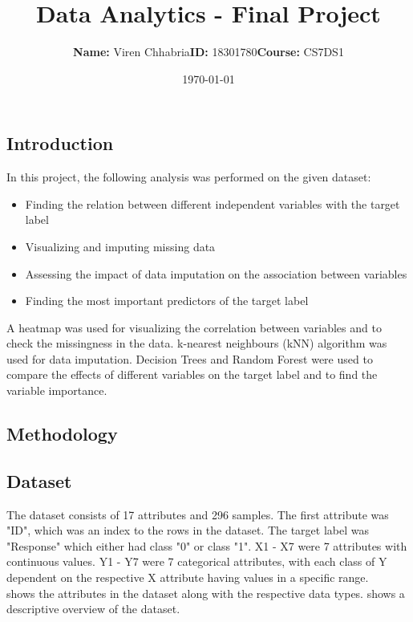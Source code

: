 \documentclass[a4paper]{article}
\title{\textbf{\textcolor{titleBlue}{Data Analytics - Final Project}}}
\author{\textcolor{titleBlue}{\textbf{Name:} Viren Chhabria\hspace{2cm}\textbf{ID:} 18301780\hspace{2cm}\textbf{Course:} CS7DS1}}
\date{\textcolor{titleBlue}{\today}}
\begin{document}
\hypersetup{%
    ,urlcolor=blue
    ,citecolor=black
    ,linkcolor=blue
    }
\maketitle

\textcolor{titleBlue}{\section{Introduction}}
\label{sec:introduction}

In this project, the following analysis was performed on the given dataset: \\
\begin{itemize}
    \item Finding the relation between different independent variables with the target label
    \item Visualizing and imputing missing data
    \item Assessing the impact of data imputation on the association between variables
    \item Finding the most important predictors of the target label
\end{itemize}
A heatmap was used for visualizing the correlation between variables and to check the missingness in the data. k-nearest neighbours (kNN) algorithm was used for data imputation. Decision Trees and Random Forest were used to compare the effects of different variables on the target label and to find the variable importance. 

\textcolor{titleBlue}{\section{Methodology}}
\label{sec:methodology}

\textcolor{titleBlue}{\subsection{Dataset}}
\label{sec:dataset}
The dataset consists of 17 attributes and 296 samples. The first attribute was "ID", which was an index to the rows in the dataset. The target label was "Response" which either had class "0" or class "1". X1 - X7 were 7 attributes with continuous values. Y1 - Y7 were 7 categorical attributes, with each class of Y dependent on the respective X attribute having values in a specific range. \\
 shows the attributes in the dataset along with the respective data types.  shows a descriptive overview of the dataset.
\end{document}
